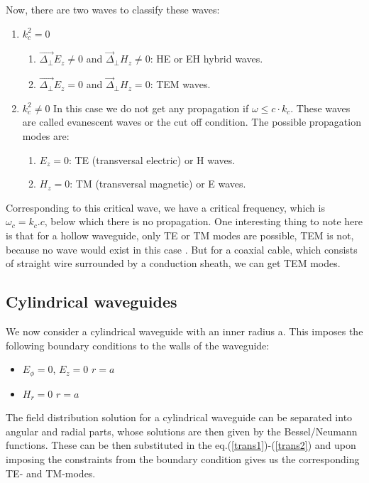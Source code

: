 \documentclass[a4paper]{report}
\numberwithin{equation}{section}
\begin{document}
Now, there are two waves to classify these waves: 
\begin{enumerate}
		\item $k_{c}^2 = 0  $ 
				\begin{enumerate}
						\item $\vec{\Delta_{\perp} }E_{z}  \ne 0$ and
						$\vec{\Delta}_{\perp}H_{z} \ne 0  $: HE or EH hybrid
						waves.
						\item $\vec{\Delta_{\perp} }E_{z}  = 0$ and
						$\vec{\Delta}_{\perp}H_{z} = 0  $: TEM waves.
				\end{enumerate}
		\item $k_{c}^2 \ne 0  $ In this case we do not get any propagation if
		$\omega \leq c \cdot k_{c} $. These waves are called evanescent waves or
		the cut off condition. The possible propagation modes are: 
		\begin{enumerate}
				\item $E_{z}=0 $: TE (transversal electric) or H waves.
				\item $H_{z}=0 $: TM (transversal magnetic) or E waves.
		\end{enumerate}
		
\end{enumerate}

Corresponding to this critical wave, we have a critical frequency, which is
$\omega_{c}=k_{c}.c $, below which there is no propagation. One interesting
thing to note here is that for a hollow waveguide, only TE or TM modes are
possible, TEM is not, because no wave would exist in this case \cite{Griffiths}. But for
a coaxial cable, which consists of straight wire surrounded by a conduction
sheath, we can get TEM modes.

\subsection{Cylindrical waveguides}
We now consider a cylindrical waveguide with an inner radius a. This imposes the
following boundary conditions to the walls of the waveguide:
\begin{itemize}
		\item $E_{\phi} = 0$, $E_{z} = 0 $  $r = a$ 
		\item $H_{r} = 0 $  $r = a$ 
\end{itemize}

The field distribution solution for a cylindrical waveguide can be separated
into angular and radial parts, whose solutions are then given by the
Bessel/Neumann functions. These can be then substituted in the
eq.(\ref{trans1})-(\ref{trans2}) and upon imposing the constraints from the
boundary condition gives us the corresponding TE- and TM-modes.
\end{document}
